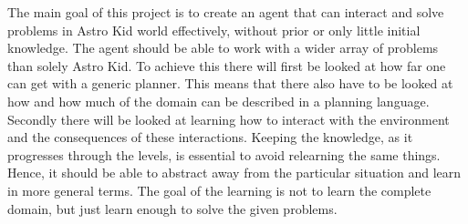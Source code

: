 	The main goal of this project is to create an agent that can interact and solve problems in Astro Kid world effectively, without prior or only little initial knowledge. The agent should be able to work with a wider array of problems than solely Astro Kid. To achieve this there will first be looked at how far one can get with a generic planner. This means that there also have to be looked at how and how much of the domain can be described in a planning language. 	Secondly there will be looked at learning how to interact with the environment and the consequences of these interactions. Keeping the knowledge, as it progresses through the levels, is essential to avoid relearning the same things. Hence, it should be able to abstract away from the particular situation and learn in more general terms.  The goal of the learning is not to learn the complete domain, but just learn enough to solve the given problems. %

%
